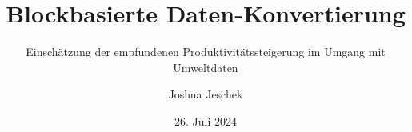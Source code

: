 \newcommand{\organization}{
    Technische Universität Chemnitz \\
    Fakultät Informatik \\
    Professur Medieninformatik \\
}
\newcommand{\thesistype}{Bachelorarbeit}
\newcommand{\degree}{Bachelor of Science}
\newcommand{\theauthor}{Joshua Jeschek}
\newcommand{\thetitle}{Blockbasierte Daten-Konvertierung}
\newcommand{\thesubtitle}{Einschätzung der empfundenen Produktivitätssteigerung im Umgang mit Umweltdaten}
\newcommand{\erstpruefer}{Dr. Thomas Wilhelm-Stein}
\newcommand{\zweitpruefer}{Dr. Werner Koch}
\newcommand{\place}{Chemnitz}
\date{26. Juli 2024}

\author{\theauthor}
\title{\thetitle}
\subtitle{\thesubtitle}

\newcommand{\ogcapi}{\textit{\acs{OGC} \acs{API} - Features}}
\newcommand{\Scratch}{\textit{Scratch}}
\newcommand{\Snap}{\textit{Snap!}}
\newcommand{\DataSnap}{\textit{DataSnap}}

